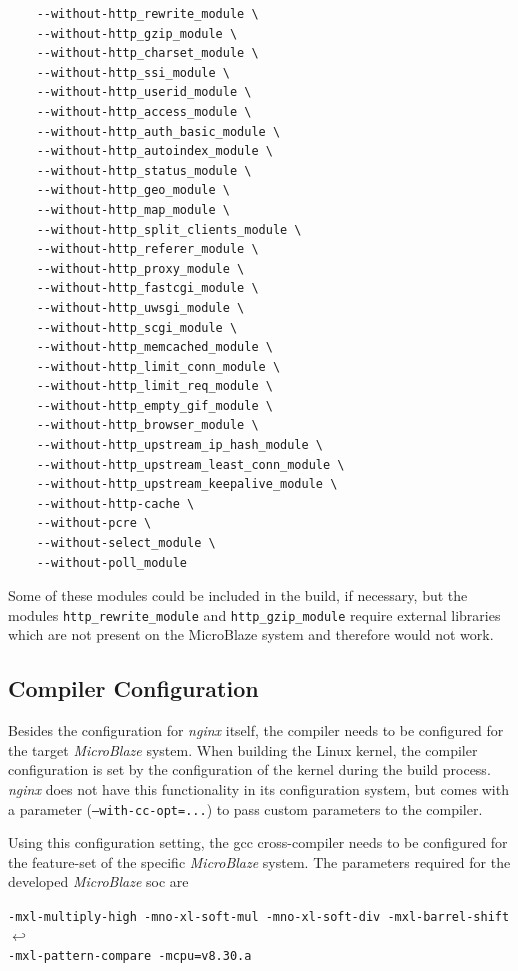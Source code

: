 \begin{verbatim}
    --without-http_rewrite_module \
    --without-http_gzip_module \
    --without-http_charset_module \
    --without-http_ssi_module \
    --without-http_userid_module \
    --without-http_access_module \
    --without-http_auth_basic_module \
    --without-http_autoindex_module \
    --without-http_status_module \
    --without-http_geo_module \
    --without-http_map_module \
    --without-http_split_clients_module \
    --without-http_referer_module \
    --without-http_proxy_module \
    --without-http_fastcgi_module \
    --without-http_uwsgi_module \
    --without-http_scgi_module \
    --without-http_memcached_module \
    --without-http_limit_conn_module \
    --without-http_limit_req_module \
    --without-http_empty_gif_module \
    --without-http_browser_module \
    --without-http_upstream_ip_hash_module \
    --without-http_upstream_least_conn_module \
    --without-http_upstream_keepalive_module \
    --without-http-cache \
    --without-pcre \
    --without-select_module \
    --without-poll_module
\end{verbatim}

Some of these modules could be included in the build, if necessary, but the modules \texttt{http\_rewrite\_module} and \texttt{http\_gzip\_module} require external libraries which are not present on the MicroBlaze system and therefore would not work.
\\

\subsection{Compiler Configuration}

Besides the configuration for \textit{nginx} itself, the compiler needs to be configured for the target \textit{MicroBlaze} system. When building the Linux kernel, the compiler configuration is set by the configuration of the kernel during the build process. \textit{nginx} does not have this functionality in its configuration system, but comes with a parameter (\texttt{--with-cc-opt=...}) to pass custom parameters to the compiler.

Using this configuration setting, the \gls{gcc} cross-compiler needs to be configured for the feature-set of the specific \textit{MicroBlaze} system. The parameters required for the developed \textit{MicroBlaze} \gls{soc} are

\texttt{-mxl-multiply-high -mno-xl-soft-mul -mno-xl-soft-div -mxl-barrel-shift} $\hookleftarrow$ \\
\texttt{-mxl-pattern-compare -mcpu=v8.30.a}

